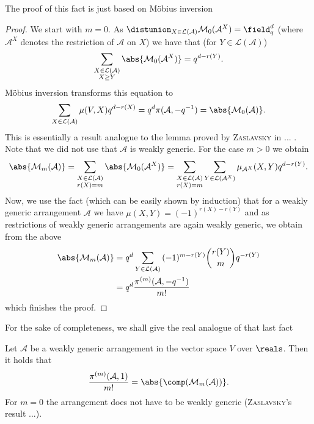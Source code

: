 \message{ !name(OnTheRAIDProblem.tex)}\documentclass[8pt,a4paper]{article}
\begin{document}
The proof of this fact is just based on Möbius inversion

\begin{proof}
We start with $m=0$.
As $\distunion_{X\in\mathcal{L}(\mathcal{A})}{\mathcal{M}_0(\mathcal{A}^X)}=\field_q^d$ (where $\mathcal{A}^X$ denotes the restriction of $\mathcal{A}$ on $X$) we have that (for $Y\in\mathcal{L}(\mathcal{A})$)
\begin{equation}
\sum_{\substack{X\in\mathcal{L}(\mathcal{A})\\ X\geq Y}}{\abs{\mathcal{M}_0(\mathcal{A}^X)}}=q^{d-r(Y)}\text{.}
\end{equation}
Möbius inversion transforms this equation to
\begin{equation}
\sum_{X\in\mathcal{L}(\mathcal{A})}{\mu(V,X)q^{d-r(X)}}=q^d\pi(\mathcal{A},-q^{-1})=\abs{\mathcal{M}_0(\mathcal{A})}\text{.}
\end{equation}
This is essentially a result analogue to the lemma proved by \textsc{Zaslavsky} in ... . Note that we did not use that $\mathcal{A}$ is weakly generic.
For the case $m>0$ we obtain
\begin{equation}
\abs{\mathcal{M}_m(\mathcal{A})}=\sum_{\substack{X\in\mathcal{L}(\mathcal{A})\\ r(X)=m}}{\abs{\mathcal{M}_0(\mathcal{A}^X)}}=\sum_{\substack{X\in\mathcal{L}(\mathcal{A})\\ r(X)=m}}{\sum_{Y\in\mathcal{L}(\mathcal{A}^X)}{\mu_{\mathcal{A}^X}(X,Y)q^{d-r(Y)}}}\text{.}
\end{equation}
Now, we use the fact (which can be easily shown by induction) that for a weakly generic arrangement $\mathcal{A}$ we have $\mu(X,Y)=(-1)^{r(X)-r(Y)}$ and as restrictions of weakly generic arrangements are again weakly generic, we obtain from the above
\begin{align}
\abs{\mathcal{M}_m(\mathcal{A})} & =q^d\sum_{Y\in\mathcal{L}(\mathcal{A})}{(-1)^{m-r(Y)}\binom{r(Y)}{m}q^{-r(Y)}}\\
& = q^d\frac{\pi^{(m)}(\mathcal{A},-q^{-1})}{m!}
\end{align}
which finishes the proof.
\end{proof}

For the sake of completeness, we shall give the real analogue of that last fact

\begin{lemma} Let $\mathcal{A}$ be a weakly generic arrangement in the vector space $V$ over $\reals$. Then it holds that
\begin{equation}
\frac{\pi^{(m)}(\mathcal{A},1)}{m!}=\abs{\comp(\mathcal{\mathcal{M}}_m(\mathcal{A}))}\text{.}
\end{equation}
For $m=0$ the arrangement does not have to be weakly generic (\textsc{Zaslavsky}'s result ...).
\end{lemma}
\end{document}
